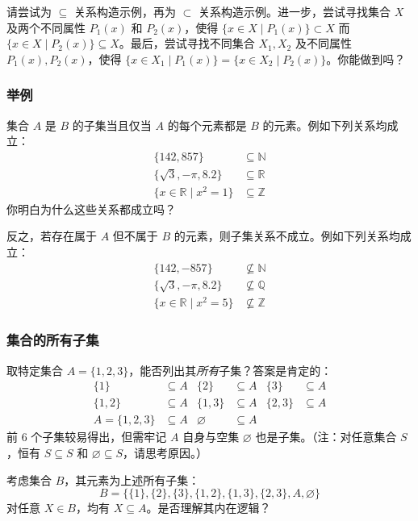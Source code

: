 请尝试为 $\subseteq$ 关系构造示例，再为 $\subset$ 关系构造示例。进一步，尝试寻找集合 $X$ 及两个不同属性 $P_1(x)$ 和 $P_2(x)$，使得 $\{x \in X \mid P_1(x)\} \subset X$ 而 $\{x \in X \mid P_2(x)\} \subseteq X$。最后，尝试寻找不同集合 $X_1, X_2$ 及不同属性 $P_1(x), P_2(x)$，使得 $\{x \in X_1 \mid P_1(x)\} = \{x \in X_2 \mid P_2(x)\}$。你能做到吗？

\subsubsection*{举例}

集合 $A$ 是 $B$ 的子集当且仅当 $A$ 的每个元素都是 $B$ 的元素。例如下列关系均成立：
\begin{align*}
    \{142, 857\} &\subseteq \mathbb{N} \\
    \{\sqrt{3}, -\pi, 8.2\} &\subseteq \mathbb{R} \\
    \{x \in \mathbb{R} \mid x^2 = 1\} &\subseteq \mathbb{Z}
\end{align*}
你明白为什么这些关系都成立吗？

反之，若存在属于 $A$ 但不属于 $B$ 的元素，则子集关系不成立。例如下列关系均成立：
\begin{align*}
    \{142, -857\} &\nsubseteq \mathbb{N} \\
    \{\sqrt{3}, -\pi, 8.2\} &\nsubseteq \mathbb{Q} \\
    \{x \in \mathbb{R} \mid x^2 = 5\} &\nsubseteq \mathbb{Z}
\end{align*}

\subsubsection*{集合的所有子集}

取特定集合 $A = \{1, 2, 3\}$，能否列出其\emph{所有}子集？答案是肯定的：
\begin{align*}
    \{1\} &\subseteq A  & \{2\} &\subseteq A & \{3\} &\subseteq A\\
    \{1,2\} &\subseteq A & \{1,3\} &\subseteq A & \{2,3\} &\subseteq A \\
    A = \{1, 2,3\} &\subseteq A & \varnothing &\subseteq A 
\end{align*}
前 6 个子集较易得出，但需牢记 $A$ 自身与空集 $\varnothing$ 也是子集。（注：对任意集合 $S$，恒有 $S \subseteq S$ 和 $\varnothing \subseteq S$，请思考原因。）

考虑集合 $B$，其元素为上述所有子集：
\[B = \big\{\{1\}, \{2\}, \{3\}, \{1, 2\}, \{1, 3\}, \{2, 3\}, A, \varnothing \big\}\]
对任意 $X \in B$，均有 $X \subseteq A$。是否理解其内在逻辑？
